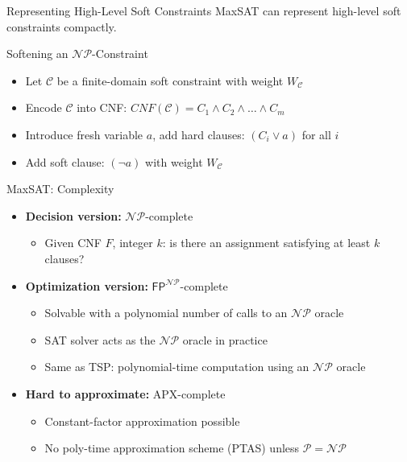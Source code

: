 \documentclass[t,english]{sdqbeamer}
\begin{document}
\begin{frame}{Representing High-Level Soft Constraints}
MaxSAT can represent high-level soft constraints compactly.\\[1em]
\begin{block}{Softening an $\mathcal{NP}$-Constraint}
\begin{itemize}\itemsep1em
  \item Let $\mathcal{C}$ be a finite-domain soft constraint with weight $W_{\mathcal{C}}$
  \item Encode $\mathcal{C}$ into CNF: $CNF(\mathcal{C}) = C_1 \wedge C_2 \wedge \dots \wedge C_m$
  \item Introduce fresh variable $a$, add hard clauses: $(C_i \vee a)$ for all $i$
  \item Add soft clause: $(\lnot a)$ with weight $W_{\mathcal{C}}$
\end{itemize}
\end{block}
\end{frame}

\begin{frame}{MaxSAT: Complexity}
\begin{itemize}\itemsep1em
  \item \textbf{Decision version:} $\mathcal{NP}$-complete\\[1ex]
  \begin{itemize}\itemsep1ex
    \item Given CNF $F$, integer $k$: is there an assignment satisfying at least $k$ clauses?
  \end{itemize}
  \item \textbf{Optimization version:} $\mathsf{FP}^{\mathcal{NP}}$-complete\\[1ex]
  \begin{itemize}\itemsep1ex
	\item Solvable with a polynomial number of calls to an $\mathcal{NP}$ oracle
	\item SAT solver acts as the $\mathcal{NP}$ oracle in practice
    \item Same as TSP: polynomial-time computation using an $\mathcal{NP}$ oracle
  \end{itemize}
  \item \textbf{Hard to approximate:} APX-complete\\[1ex]
  \begin{itemize}\itemsep1ex
    \item Constant-factor approximation possible
    \item No poly-time approximation scheme (PTAS) unless $\mathcal{P} = \mathcal{NP}$
  \end{itemize}
\end{itemize}
\end{frame}
\end{document}
